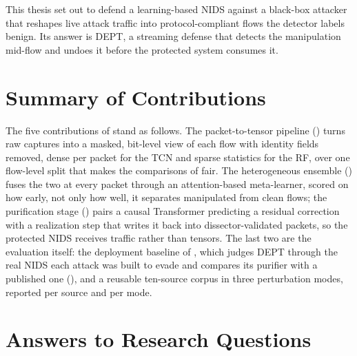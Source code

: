 \label{chap:conclusion}

This thesis set out to defend a learning-based \ac{NIDS} against a black-box attacker that
reshapes live attack traffic into protocol-compliant flows the detector labels benign. Its answer
is DEPT, a streaming defense that detects the manipulation mid-flow and undoes it before the
protected system consumes it.

\section{Summary of Contributions}\label{sec:concl-summary}

The five contributions of  stand as follows. The packet-to-tensor
pipeline () turns raw captures into a masked, bit-level view of each flow
with identity fields removed, dense per packet for the \ac{TCN} and sparse statistics for the
\ac{RF}, over one flow-level split that makes the comparisons of 
fair. The heterogeneous ensemble () fuses the two at every packet
through an attention-based meta-learner, scored on how early, not only how well, it separates
manipulated from clean flows; the purification stage () pairs a causal
Transformer predicting a residual correction with a realization step that writes it back into
dissector-validated packets, so the protected \ac{NIDS} receives traffic rather than tensors. The
last two are the evaluation itself: the deployment baseline of , which
judges DEPT through the real \ac{NIDS} each attack was built to evade and compares its purifier with a
published one (), and a reusable ten-source
corpus in three perturbation modes, reported per source and per mode.

\section{Answers to Research Questions}\label{sec:concl-rqs}

